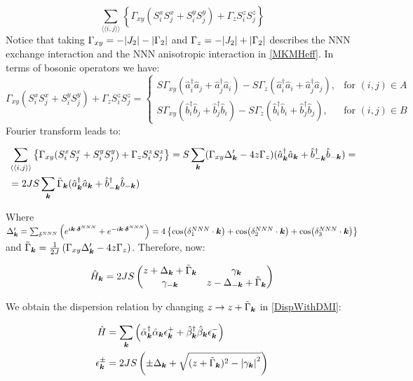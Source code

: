 \begin{equation}
\sum_{\langle \langle i,j \rangle \rangle} \left\{ \Gamma_{xy}(S_i^xS_j^x + S_i^yS_j^y) + \Gamma_zS_i^zS_j^z\right\}
\end{equation}
Notice that taking $\Gamma_{xy} = -\abs{J_2}-\abs{\Gamma_2}$ and $\Gamma_z = -\abs{J_2}+\abs{\Gamma_2}$ describes the NNN exchange interaction and the NNN anisotropic interaction in \ref{MKMHeff}. In terms of bosonic operators we have:
\begin{equation}
\Gamma_{xy}(S_i^xS_j^x + S_i^yS_j^y) + \Gamma_zS_i^zS_j^z = \begin{cases}
             S\Gamma_{xy}(\hat{a}_i^\dagger\hat{a}_j+\hat{a}_j^\dagger\hat{a}_i) - S\Gamma_z(\hat{a}_i^\dagger\hat{a}_i+\hat{a}_j^\dagger\hat{a}_j),  & \text{for } (i,j) \in A \\
             S\Gamma_{xy}(\hat{b}_i^\dagger\hat{b}_j+\hat{b}_j^\dagger\hat{b}_i) - S\Gamma_z(\hat{b}_i^\dagger\hat{b}_i+\hat{b}_j^\dagger\hat{b}_j),  & \text{for } (i,j) \in B
       \end{cases} \quad
\end{equation}
Fourier transform leads to:

\begin{align*}
&\sum_{\langle \langle i,j \rangle \rangle} \left\{ \Gamma_{xy}(S_i^xS_j^x + S_i^yS_j^y) + \Gamma_zS_i^zS_j^z\right\}
= S\sum_{\boldsymbol{k}} (\Gamma_{xy}\Delta'_{\boldsymbol{k}}-4z\Gamma_z) (\hat{a}^\dagger_{\boldsymbol{k}}\hat{a}_{\boldsymbol{k}}+\hat{b}^\dagger_{-\boldsymbol{k}}\hat{b}_{-\boldsymbol{k}}) = \\
&=2JS\sum_{\boldsymbol{k}} \tilde{\Gamma}_{\boldsymbol{k}}(\hat{a}^\dagger_{\boldsymbol{k}}\hat{a}_{\boldsymbol{k}}+\hat{b}^\dagger_{-\boldsymbol{k}}\hat{b}_{-\boldsymbol{k}})
\end{align*}

Where $\Delta'_{\boldsymbol{k}} = \sum_{\delta^{NNN}} \left( e^{i\boldsymbol{k}\cdot \boldsymbol{\delta}^{NNN}} +  e^{-i\boldsymbol{k}\cdot \boldsymbol{\delta}^{NNN}}\right) = 4\left\{ \cos(\delta^{NNN}_1\cdot\boldsymbol{k}) + \cos(\delta^{NNN}_2\cdot\boldsymbol{k}) + \cos(\delta^{NNN}_3\cdot\boldsymbol{k})\right\}$ and $\tilde{\Gamma}_{\boldsymbol{k}} = \frac{1}{2J}\left( \Gamma_{xy}\Delta'_{\boldsymbol{k}}-4z\Gamma_z \right)$. Therefore, now:

\begin{equation}
\hat{H}_{\boldsymbol{k}} = 2JS\begin{pmatrix} 
z + \Delta_{\boldsymbol{k}} + \tilde{\Gamma}_{\boldsymbol{k}} & \gamma_{\boldsymbol{k}} \\
\gamma_{-\boldsymbol{k}} & z - \Delta_{-\boldsymbol{k}} + \tilde{\Gamma}_{\boldsymbol{k}}
\end{pmatrix}
\end{equation}

We obtain the dispersion relation by changing $z \rightarrow z + \tilde{\Gamma}_{\boldsymbol{k}}$ in \ref{DispWithDMI}:

\begin{align}
\hat{H} &= \sum_{\boldsymbol{k}} \left( \hat{\alpha}_{\boldsymbol{k}}^\dagger \hat{\alpha}_{\boldsymbol{k}} \epsilon_{\boldsymbol{k}}^+ +\hat{\beta}_{\boldsymbol{k}}^\dagger \hat{\beta}_{\boldsymbol{k}}  \epsilon_{\boldsymbol{k}}^- \right) \label{DispWithDMI} \\
\epsilon_{\boldsymbol{k}}^\pm &= 2JS \left( \pm \Delta_{\boldsymbol{k}} +  \sqrt{(z + \tilde{\Gamma}_{\boldsymbol{k}})^2-\abs{\gamma_{\boldsymbol{k}}}^2} \right)
\end{align}

